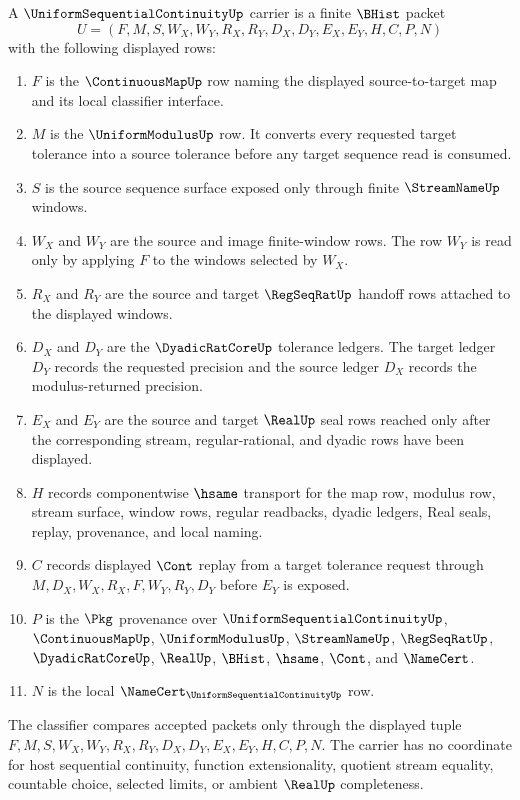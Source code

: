 \begin{definition}
\label{def:uniform-sequential-continuity-carrier}
A $\UniformSequentialContinuityUp$ carrier is a finite $\BHist$ packet
$$
U=(F,M,S,W_X,W_Y,R_X,R_Y,D_X,D_Y,E_X,E_Y,H,C,P,N)
$$
with the following displayed rows:
\begin{enumerate}
\item $F$ is the $\ContinuousMapUp$ row naming the displayed source-to-target map and its local classifier interface.
\item $M$ is the $\UniformModulusUp$ row. It converts every requested target tolerance into a source tolerance before any target sequence read is consumed.
\item $S$ is the source sequence surface exposed only through finite $\StreamNameUp$ windows.
\item $W_X$ and $W_Y$ are the source and image finite-window rows. The row $W_Y$ is read only by applying $F$ to the windows selected by $W_X$.
\item $R_X$ and $R_Y$ are the source and target $\RegSeqRatUp$ handoff rows attached to the displayed windows.
\item $D_X$ and $D_Y$ are the $\DyadicRatCoreUp$ tolerance ledgers. The target ledger $D_Y$ records the requested precision and the source ledger $D_X$ records the modulus-returned precision.
\item $E_X$ and $E_Y$ are the source and target $\RealUp$ seal rows reached only after the corresponding stream, regular-rational, and dyadic rows have been displayed.
\item $H$ records componentwise $\hsame$ transport for the map row, modulus row, stream surface, window rows, regular readbacks, dyadic ledgers, Real seals, replay, provenance, and local naming.
\item $C$ records displayed $\Cont$ replay from a target tolerance request through $M,D_X,W_X,R_X,F,W_Y,R_Y,D_Y$ before $E_Y$ is exposed.
\item $P$ is the $\Pkg$ provenance over $\UniformSequentialContinuityUp$, $\ContinuousMapUp$, $\UniformModulusUp$, $\StreamNameUp$, $\RegSeqRatUp$, $\DyadicRatCoreUp$, $\RealUp$, $\BHist$, $\hsame$, $\Cont$, and $\NameCert$.
\item $N$ is the local $\NameCert_{\UniformSequentialContinuityUp}$ row.
\end{enumerate}
The classifier compares accepted packets only through the displayed tuple $F,M,S,W_X,W_Y,R_X,R_Y,D_X,D_Y,E_X,E_Y,H,C,P,N$. The carrier has no coordinate for host sequential continuity, function extensionality, quotient stream equality, countable choice, selected limits, or ambient $\RealUp$ completeness.
\end{definition}

